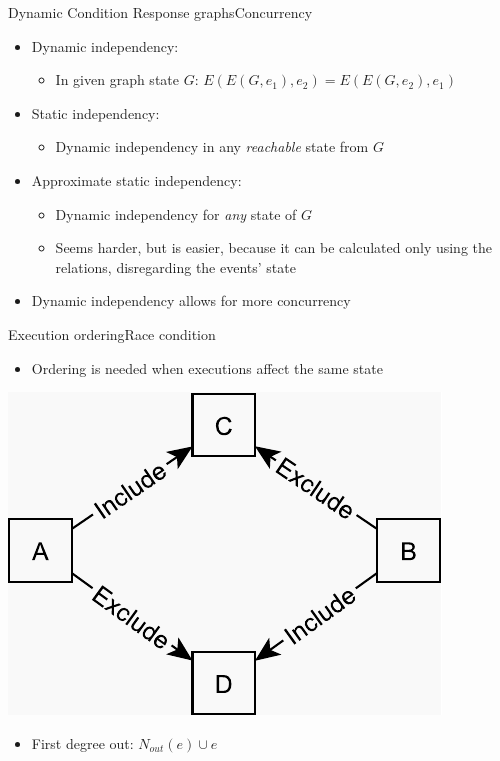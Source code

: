 \documentclass{beamer}
\begin{document}
\begin{frame}{Dynamic Condition Response graphs}{Concurrency}
	\begin{itemize}
		\item Dynamic independency:
		\begin{itemize}
			\item In given graph state $G$: $E(E(G, e_1),e_2)=E(E(G, e_2),e_1)$
		\end{itemize}

		\vfill

		\item Static independency:
		\begin{itemize}
			\item Dynamic independency in any \textit{reachable} state from $G$
		\end{itemize}

		\vfill

		\item Approximate static independency:
		\begin{itemize}
		 	\item Dynamic independency for \textit{any} state of $G$
		 	\item Seems harder, but is easier, because it can be calculated only using the relations, disregarding the events' state
		\end{itemize}

		\vfill

		\item Dynamic independency allows for more concurrency
  \end{itemize}
\end{frame}

\begin{frame}{Execution ordering}{Race condition}%
	\begin{itemize}
		\item Ordering is needed when executions affect the same state
	\end{itemize}
	\vspace{\fill}
	\centering
    \includegraphics[scale=0.5]{figures/race-condition.pdf}
    \vspace{\fill}
    \begin{itemize}
    	\item First degree out: $N_{out}(e) \cup e$
    \end{itemize}
\end{frame}
\end{document}
